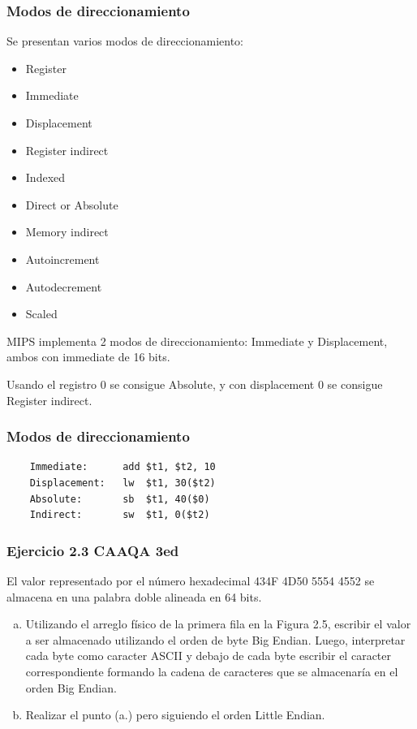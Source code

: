 \documentclass{beamer}
\begin{document}
\begin{frame}
 \frametitle{Modos de direccionamiento}
Se presentan varios modos de direccionamiento: 
\begin{multicols}{2}
\begin{itemize}
 \item Register
 \item Immediate
 \item Displacement
 \item Register indirect
 \item Indexed
 \item Direct or Absolute
 \item Memory indirect
 \item Autoincrement
 \item Autodecrement
 \item Scaled
 \end{itemize}
\end{multicols}

MIPS implementa 2 modos de direccionamiento: Immediate y Displacement, ambos con immediate de 16 bits.
    
Usando el registro 0 se consigue Absolute, y con displacement 0 se consigue Register indirect.
\end{frame}

\begin{frame}[fragile]
\frametitle{Modos de direccionamiento}

\begin{lstlisting}
    Immediate:		add	$t1, $t2, 10	
    Displacement:	lw	$t1, 30($t2)
    Absolute:		sb	$t1, 40($0)
    Indirect:		sw	$t1, 0($t2)
\end{lstlisting}
\end{frame}

\begin{frame}
 \frametitle{Ejercicio 2.3 CAAQA 3ed}
 El valor representado por el número hexadecimal 434F 4D50 5554 4552 se almacena en una palabra doble alineada en 64 bits.

 \begin{enumerate}[a.]
  \item Utilizando el arreglo físico de la primera fila en la Figura 2.5, escribir el valor a ser almacenado utilizando el orden de byte Big Endian. Luego, interpretar cada byte como caracter ASCII y debajo de cada byte escribir el caracter correspondiente formando la cadena de caracteres que se almacenaría en el orden Big Endian.
  
  \item Realizar el punto (a.) pero siguiendo el orden Little Endian.

 \end{enumerate}

\end{frame}
\end{document}
